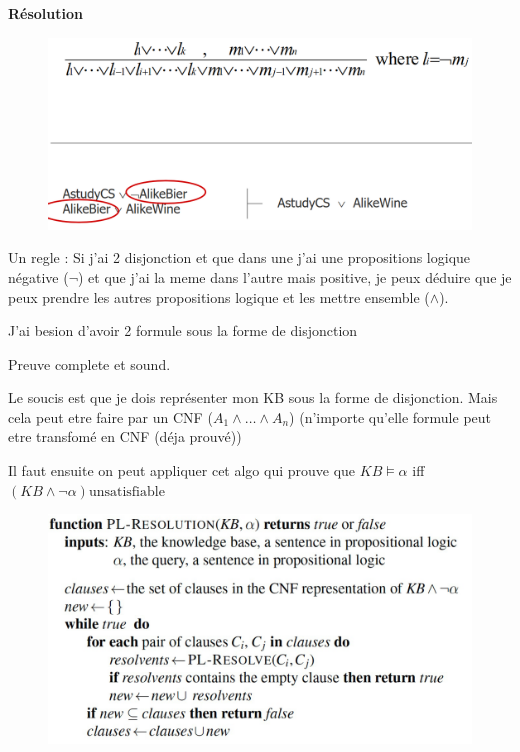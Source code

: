 			\textbf{Résolution}
			
				\begin{figure}[H]
					\centering
					\includegraphics[width=\textwidth]{img/proof.png}
				\end{figure}
				
				
				Un regle : Si j'ai 2 disjonction et que dans une j'ai une propositions logique négative ($\neg$) et que j'ai la meme dans l'autre mais positive, je peux déduire que je peux prendre les autres propositions logique et les mettre ensemble ($\land$).
			
				J'ai besion d'avoir 2 formule sous la forme de disjonction
				
				Preuve complete et sound.
				
				Le soucis est que je dois représenter mon KB sous la forme de disjonction. Mais cela peut etre faire par un CNF ($A_1\land \dots \land A_n$) (n'importe qu'elle formule peut etre transfomé en CNF (déja prouvé))
				
				
				Il faut ensuite on peut appliquer cet algo qui prouve que $KB \models \alpha$ iff $(KB \land \neg \alpha) \text{unsatisfiable}$
				
				\begin{figure}[H]
					\centering
					\includegraphics[width=\textwidth]{img/proof1.png}
				\end{figure}
				
